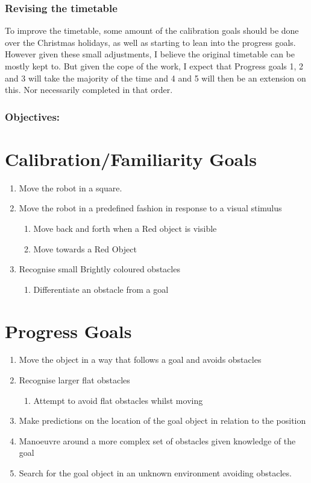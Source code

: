 \documentclass[10pt,a4paper]{report}
\begin{document}
			\subsubsection*{Revising the timetable}
				To improve the timetable, some amount of the calibration goals should be done over the Christmas holidays, as well as starting to lean into the progress goals. However given these small adjustments, I believe the original timetable can be mostly kept to. But given the cope of the work, I expect that Progress goals 1, 2 and 3 will take the majority of the time and 4 and 5 will then be an extension on this. Nor necessarily completed in that order. 
			\subsubsection*{Objectives:}
				\section{Calibration/Familiarity Goals}
					\begin{enumerate}
						\item Move the robot in a square.
						\item Move the robot in a predefined fashion in response to a visual stimulus 
						\begin{enumerate}
							\item  Move back and forth when a Red object is visible
							\item Move towards a Red Object
						\end{enumerate}
						\item Recognise small Brightly coloured obstacles
						\begin{enumerate}
							\item Differentiate an obstacle from a goal
						\end{enumerate}
					\end{enumerate}
				
				\section{Progress Goals}
				\begin{enumerate}
					\item Move the object in a way that follows a goal and avoids obstacles
					\item Recognise larger flat obstacles 
					\begin{enumerate}
						\item Attempt to avoid flat obstacles whilst moving
					\end{enumerate}
					\item Make predictions on the location of the goal object in relation to the position
					\item Manoeuvre around a more complex set of obstacles given knowledge of the goal
					\item Search for the goal object in an unknown environment avoiding obstacles.
				\end{enumerate}
			
\end{document}
